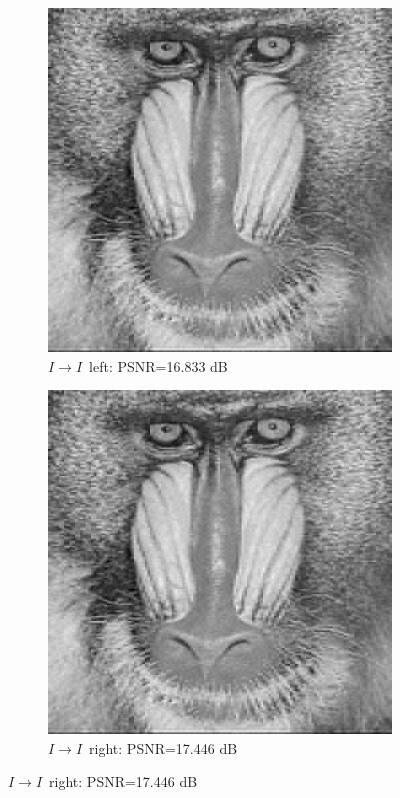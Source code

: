 \documentclass[10pt,twoside,titlepage]{article}
\newcommand{\sysII}{\mbox{$I \rightarrow I$}}
\begin{document}
\begin{figure}
    \centering
    \begin{subfigure}{0.5\textwidth}
        \centering
        \includegraphics[width=0.6\linewidth]{img/baboon_ii_left.png}
        \caption{\sysII\ left: PSNR=16.833 dB}
    \end{subfigure}%
    \begin{subfigure}{0.5\textwidth}
        \centering
        \includegraphics[width=0.6\linewidth]{img/baboon_ii_right.png}
        \caption{\sysII\ right: PSNR=17.446 dB}
    \end{subfigure}
    \label{fig:baboon_ii}


\end{figure}
\end{document}
